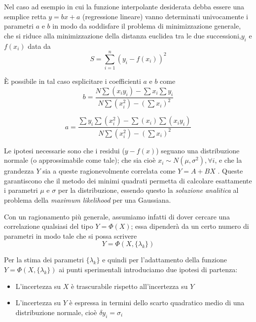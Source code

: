 \documentclass[12pt,openright,twoside,a4paper]{book}
\begin{document}
Nel caso ad esempio in cui la funzione interpolante desiderata debba essere una semplice retta $y=bx+a$ (regressione lineare) vanno determinati univocamente i parametri $a$ e $b$ in modo da soddisfare il problema di minimizzazione generale, che si riduce alla minimizzazione della distanza euclidea tra le due successioni,$y_i$ e $f(x_i)$ data da
\begin{equation}
 S = \sum_{i=1}^n \left(y_i - f(x_i)\right)^2
\end{equation}

È possibile in tal caso esplicitare i coefficienti $a$ e $b$ come
\begin{equation}
b=\frac{ N \sum (x_i y_i) - \sum x_i \sum y_i}{N\sum (x_i^2)-(\sum x_i)^2}
\end{equation}

\begin{equation}
a=\frac{\sum y_i \sum (x_i^2)- \sum (x_i) \sum (x_i y_i)}{N\sum (x_i^2)-(\sum x_i)^2}
\end{equation}

Le ipotesi necessarie sono che i residui ($y-f(x)$) seguano una distribuzione normale (o approssimabile come tale); che sia cioè $x_{i}\sim N(\mu,\sigma^{2}), \forall i$, e che la grandezza $Y$ sia a queste ragionevolmente correlata come $Y=A+BX$ . 
Queste garantiscono che il metodo dei minimi quadrati permetta di calcolare esattamente i parametri $\mu$ e $\sigma$ per la distribuzione, essendo questo la \textit{soluzione analitica} al problema della \textit{maximum likelihood} per una Gaussiana.

Con un ragionamento più generale, assumiamo infatti di dover cercare una correlazione qualsiasi del tipo $Y=\Phi(X)$; essa dipenderà da un certo numero di parametri in modo tale che si possa scrivere
\begin{equation}
Y=\Phi(X,\{\lambda_k\})
\end{equation}

Per la stima dei parametri $\{\lambda_k\}$ e quindi per l'adattamento della funzione $Y=\Phi(X,\{\lambda_k\})$ ai punti sperimentali introduciamo due ipotesi di partenza:
\begin{itemize}
\item L'incertezza su $X$ è trascurabile rispetto all'incertezza su $Y$
\item L'incertezza su $Y$ è espressa in termini dello scarto quadratico medio di una distribuzione normale, cioè $\delta y_i=\sigma_i$
\end{itemize}
\end{document}
